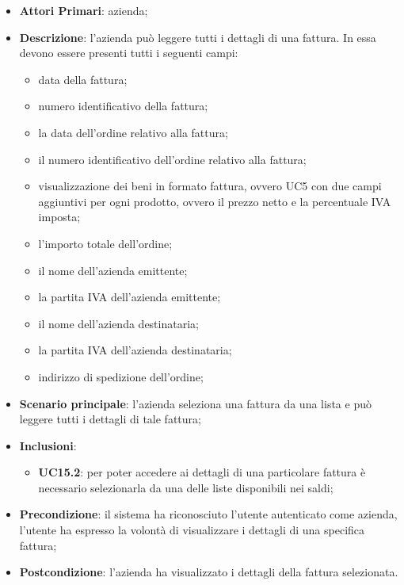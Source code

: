 \begin{itemize}
	\item \textbf{Attori Primari}: azienda;
	\item \textbf{Descrizione}: l'azienda può leggere tutti i dettagli di una fattura. In essa devono essere presenti tutti i seguenti campi:
	\begin{itemize}
		\item data della fattura;
		\item numero identificativo della fattura;
		\item la data dell'ordine relativo alla fattura;
		\item il numero identificativo dell'ordine relativo alla fattura;
		\item visualizzazione dei beni in formato fattura, ovvero UC5 con due campi aggiuntivi per ogni prodotto, ovvero il prezzo netto e la percentuale IVA imposta;
		\item l'importo totale dell'ordine;
		\item il nome dell'azienda emittente;
		\item la partita IVA dell'azienda emittente;
		\item il nome dell'azienda destinataria;
		\item la partita IVA dell'azienda destinataria;
		\item indirizzo di spedizione dell'ordine;
	\end{itemize}
	\item \textbf{Scenario principale}: l'azienda seleziona una fattura da una lista e può leggere tutti i dettagli di tale fattura;
	\item \textbf{Inclusioni}:
	\begin{itemize}
		\item \textbf{UC15.2}: per poter accedere ai dettagli di una particolare fattura è necessario selezionarla da una delle liste disponibili nei saldi;
	\end{itemize}
	\item \textbf{Precondizione}: il sistema ha riconosciuto l'utente autenticato come azienda, l'utente ha espresso la volontà di visualizzare i dettagli di una specifica fattura;
	\item \textbf{Postcondizione}: l'azienda ha visualizzato i dettagli della fattura selezionata.
\end{itemize} 


